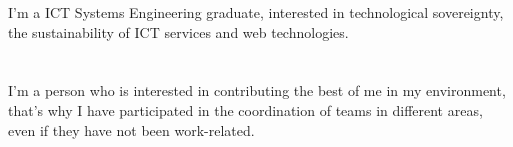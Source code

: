 \documentclass[9pt]{developercv} %
\begin{document}
\vspace{0.5cm}



\begin{minipage}[t]{0.4\textwidth} %
	\vspace{-\baselineskip} %
	I'm a ICT Systems Engineering graduate, interested in technological sovereignty, the sustainability of ICT services and web technologies.\\
	\\
	\\
	I'm a person who is interested in contributing the best of me in my environment, that's why I have participated in the coordination of teams in different areas, even if they have not been work-related.
\end{minipage}
\hfill %
\begin{minipage}[t]{0.5\textwidth} %
	\vspace{-\baselineskip} %
	\begin{barchart}{5.5}
	\end{barchart}
\end{minipage}


\end{document}
